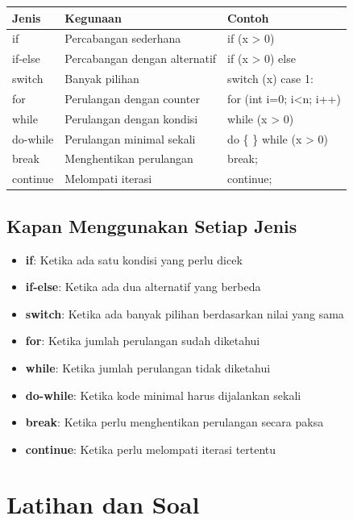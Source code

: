 \begin{center}
\begin{tabular}{|l|l|l|}
\hline
\textbf{Jenis} & \textbf{Kegunaan} & \textbf{Contoh} \\
\hline
if & Percabangan sederhana & if (x > 0) \\
\hline
if-else & Percabangan dengan alternatif & if (x > 0) else \\
\hline
switch & Banyak pilihan & switch (x) case 1: \\
\hline
for & Perulangan dengan counter & for (int i=0; i<n; i++) \\
\hline
while & Perulangan dengan kondisi & while (x > 0) \\
\hline
do-while & Perulangan minimal sekali & do \{ \} while (x > 0) \\
\hline
break & Menghentikan perulangan & break; \\
\hline
continue & Melompati iterasi & continue; \\
\hline
\end{tabular}
\end{center}

\subsection{Kapan Menggunakan Setiap Jenis}

\begin{itemize}
\item \textbf{if}: Ketika ada satu kondisi yang perlu dicek
\item \textbf{if-else}: Ketika ada dua alternatif yang berbeda
\item \textbf{switch}: Ketika ada banyak pilihan berdasarkan nilai yang sama
\item \textbf{for}: Ketika jumlah perulangan sudah diketahui
\item \textbf{while}: Ketika jumlah perulangan tidak diketahui
\item \textbf{do-while}: Ketika kode minimal harus dijalankan sekali
\item \textbf{break}: Ketika perlu menghentikan perulangan secara paksa
\item \textbf{continue}: Ketika perlu melompati iterasi tertentu
\end{itemize}

\section{Latihan dan Soal}

